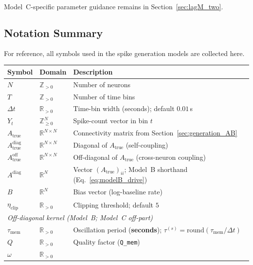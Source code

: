 \documentclass[11pt]{article}
\begin{document}
Model~C-specific parameter guidance remains in
Section~\ref{sec:lagM_two}.

\newpage
\subsection{Notation Summary}
\label{sec:notation}

For reference, all symbols used in the spike generation models are
collected here.

\begin{table}[h]
\centering
\begingroup
\renewcommand{\arraystretch}{1.22}
\begin{tabular}{lll}
\toprule
Symbol & Domain & Description \\
\midrule
$N$    & $\mathbb{Z}_{>0}$ & Number of neurons \\
$T$    & $\mathbb{Z}_{>0}$ & Number of time bins \\
$\Delta t$ & $\mathbb{R}_{>0}$ &
  Time-bin width (seconds); default $0.01$\,s \\
$Y_t$  & $\mathbb{Z}_{\geq 0}^{N}$ &
  Spike-count vector in bin $t$ \\
$A_{\text{true}}$ & $\mathbb{R}^{N\times N}$ &
  Connectivity matrix from Section~\ref{sec:generation_AB} \\
$A_{\text{true}}^{\mathrm{diag}}$ & $\mathbb{R}^{N\times N}$ &
  Diagonal of $A_{\text{true}}$ (self-coupling) \\
$A_{\text{true}}^{\mathrm{off}}$ & $\mathbb{R}^{N\times N}$ &
  Off-diagonal of $A_{\text{true}}$ (cross-neuron coupling) \\
$A^{\mathrm{diag}}$ & $\mathbb{R}^{N}$ &
  Vector $(A_{\text{true}})_{ii}$; Model~B shorthand (Eq.~\ref{eq:modelB_drive}) \\
$B$    & $\mathbb{R}^{N}$ &
  Bias vector (log-baseline rate) \\
$\eta_{\mathrm{clip}}$ & $\mathbb{R}_{>0}$ &
  Clipping threshold; default $5$ \\
\midrule
\multicolumn{3}{l}{\textit{Off-diagonal kernel (Model~B; Model~C off-part)}} \\
$\tau_{\mathrm{mem}}$ & $\mathbb{R}_{>0}$ &
  Oscillation period (\textbf{seconds}); $\tau^{(s)}=\mathrm{round}(\tau_{\mathrm{mem}}/\Delta t)$ \\
$Q$    & $\mathbb{R}_{>0}$ &
  Quality factor (\texttt{Q\_mem}) \\
$\omega$ & $\mathbb{R}_{>0}$ &

\end{tabular}
\end{table}
\end{document}
